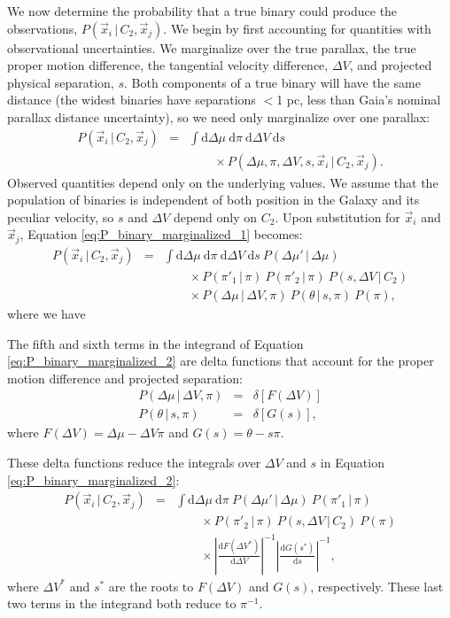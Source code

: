 \documentclass[usenatbib]{mnras}
\newcommand{\given}{\,|\,}
\newcommand{\dd}{\mathrm{d}}
\begin{document}
We now determine the probability that a true binary could produce the observations, $P(\vec{x}_i \given C_2, \vec{x}_j)$. We begin by first accounting for quantities with observational uncertainties. We marginalize over the true parallax, the true proper motion difference, the tangential velocity difference, $\Delta V$, and projected physical separation, $s$. Both components of a true binary will have the same distance (the widest binaries have separations $<$1 pc, less than Gaia's nominal parallax distance uncertainty), so we need only marginalize over one parallax:
\begin{eqnarray}
P(\vec{x}_i \given C_2, \vec{x}_j) &=& \int \dd \Delta \mu\ \dd \pi\ \dd \Delta V\ \dd s\ \nonumber \\
& & \qquad \times P( \Delta \mu, \pi, \Delta V, s,\vec{x}_i \given C_2, \vec{x}_j ). \label{eq:P_binary_marginalized_1}
\end{eqnarray}
Observed quantities depend only on the underlying values. We assume that the population of binaries is independent of both position in the Galaxy and its peculiar velocity, so $s$ and $\Delta V$ depend only on $C_2$. Upon substitution for $\vec{x}_i$ and $\vec{x}_j$, Equation \ref{eq:P_binary_marginalized_1} becomes:  
\begin{eqnarray}
P(\vec{x}_i \given C_2, \vec{x}_j) &=& \int \dd \Delta \mu\ \dd \pi\ \dd \Delta V\ \dd s\ P(\Delta \mu' \given \Delta \mu) \nonumber \\
& & \qquad \times P(\pi'_1 \given \pi)\ P(\pi'_2 \given \pi)\ P(s, \Delta V \given C_2) \nonumber \\
& & \qquad \times P(\Delta \mu \given \Delta V, \pi)\ P(\theta \given s, \pi)\ P(\pi), \label{eq:P_binary_marginalized_2}
\end{eqnarray}
where we have 

The fifth and sixth terms in the integrand of Equation \ref{eq:P_binary_marginalized_2} are delta functions that account for the proper motion difference and projected separation:
\begin{eqnarray}
P(\Delta \mu \given \Delta V, \pi) &=& \delta \left[ F(\Delta V) \right] \\ 
P(\theta \given s, \pi) &=& \delta \left[ G(s) \right], 
\end{eqnarray}
where $F(\Delta V) = \Delta \mu - \Delta V \pi$ and $G(s) = \theta - s \pi$. 

These delta functions reduce the integrals over $\Delta V$ and $s$ in Equation \ref{eq:P_binary_marginalized_2}:
\begin{eqnarray}
P(\vec{x}_i \given C_2, \vec{x}_j) &=& \int \dd \Delta \mu\ \dd \pi\ P(\Delta \mu' \given \Delta \mu)\ P(\pi'_1 \given \pi) \nonumber \\
& & \qquad \times P(\pi'_2 \given \pi)\ P(s, \Delta V \given C_2)\ P(\pi) \nonumber \\
& & \qquad \times  \left| \frac{\dd F(\Delta V^*)}{\dd \Delta V} \right|^{-1} \left| \frac{\dd G(s^*)}{\dd s} \right|^{-1}, \label{eq:P_binary_marginalized}
\end{eqnarray}
where $\Delta V^*$ and $s^*$ are the roots to $F(\Delta V)$ and $G(s)$, respectively. These last two terms in the integrand both reduce to $\pi^{-1}$.
\end{document}
